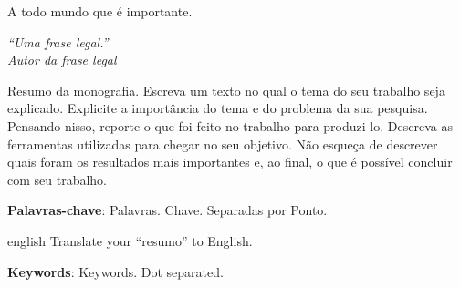 \documentclass[
	12pt,				%
	openright,			%
	oneside,			%
	a4paper,			%
	english,			%
	french,				%
	spanish,			%
	brazil				%
	]{abntex2}
\theoremstyle{plain}
\theoremstyle{definition}
\theoremstyle{remark}
\begin{document}
\begin{agradecimentos}

A todo mundo que é importante.

\end{agradecimentos}

\begin{epigrafe}
    \vspace*{\fill}
	\begin{flushright}
		\textit{``Uma frase legal.'' \\
		Autor da frase legal} \vspace*{3cm}
	\end{flushright}
\end{epigrafe}


\setlength{\absparsep}{18pt} %
\begin{resumo}
Resumo da monografia. Escreva um texto no qual o tema do seu trabalho seja explicado. Explicite a importância do tema e do problema da sua pesquisa. Pensando nisso, reporte o que foi feito no trabalho para produzi-lo. Descreva as ferramentas utilizadas para chegar no seu objetivo. Não esqueça de descrever quais foram os resultados mais importantes e, ao final, o que é possível concluir com seu trabalho.

 \textbf{Palavras-chave}: Palavras. Chave. Separadas por Ponto.
\end{resumo}

\begin{resumo}[Abstract]
 \begin{otherlanguage*}{english}
Translate your ``resumo'' to English.

   \vspace{\onelineskip}
 
   \noindent 
   \textbf{Keywords}: Keywords. Dot separated.
 \end{otherlanguage*}
\end{resumo}


\listoffigures*
\cleardoublepage


\listoftables
\cleardoublepage

\tableofcontents* 
\cleardoublepage
\end{document}
